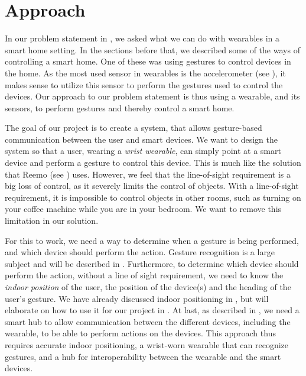 \section{Approach}\label{sec:approach}
In our problem statement in , 
we asked what we can do with wearables in a smart home setting.
In the sections before that, 
we described some of the ways of controlling a smart home. 
One of these was using gestures to control devices in the home. 
As the most used sensor in wearables is the accelerometer (see ), 
it makes sense to utilize this sensor to perform the gestures used to control the devices. 
Our approach to our problem statement is thus using a wearable, 
and its sensors, to perform gestures and thereby control a smart home. 

The goal of our project is to create a system, 
that allows gesture-based communication between the user and smart devices.
We want to design the system so that a user, wearing a \emph{wrist wearable}, 
can simply point at a smart device and perform a gesture to control this device. 
This is much like the solution that Reemo (see ) uses. 
However, we feel that the line-of-sight requirement is a big loss of control, 
as it severely limits the control of objects.
With a line-of-sight requirement, 
it is impossible to control objects in other rooms, 
such as turning on your coffee machine while you are in your bedroom. 
We want to remove this limitation in our solution. 

For this to work, we need a way to determine when a gesture is being performed, 
and which device should perform the action. 
Gesture recognition is a large subject and will be described in . 
Furthermore, to determine which device should perform the action, 
without a line of sight requirement, 
we need to know the \emph{indoor position} of the user, 
the position of the device(s) and the heading of the user's gesture. 
We have already discussed indoor positioning in , 
but will elaborate on how to use it for our project in .
At last, as described in , 
we need a smart hub to allow communication between the different devices, 
including the wearable, to be able to perform actions on the devices. 
This approach thus requires accurate indoor positioning, 
a wrist-worn wearable that can recognize gestures, 
and a hub for interoperability between the wearable and the smart devices. 
 